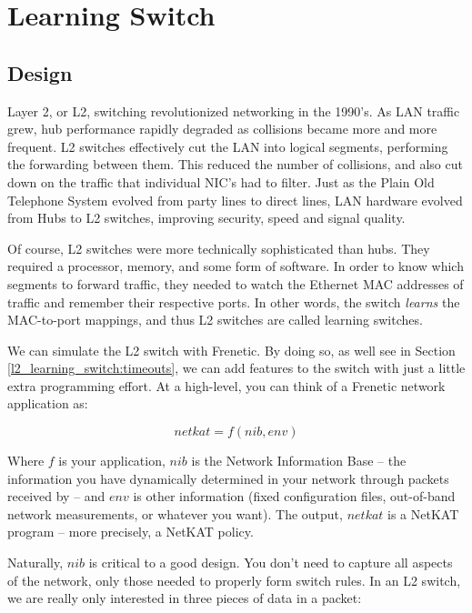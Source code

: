 
\chapter{Learning Switch}

\section{Design}
\label{l2_learning_switch:design}

Layer 2, or L2, switching revolutionized networking in the 1990's.
As LAN traffic grew, hub performance rapidly degraded as collisions became more and more frequent.
L2 switches effectively cut the LAN into logical segments, performing the forwarding between them.
This reduced the number of collisions, and also cut down on the traffic that individual
NIC's had to filter.  Just as the Plain Old 
Telephone System evolved from party lines to direct lines, LAN hardware evolved from Hubs to 
L2 switches, improving security, speed and signal quality.

Of course, L2 switches were more technically sophisticated than hubs.  They required a processor, memory, and 
some form of software.  In order to know which segments to forward traffic, they needed to 
watch the Ethernet MAC addresses of traffic and remember their respective ports.  In other words, the switch 
\emph{learns} the MAC-to-port mappings, and thus L2 switches are called learning switches.    

We can simulate the L2 switch with Frenetic.  By doing so, as well see in 
Section \ref{l2_learning_switch:timeouts},
we can add features to the switch with just a little extra programming effort.  At a high-level, 
you can think of a Frenetic network application as:

$$ netkat = f( nib, env ) $$

Where $f$ is your application, $nib$ is the Network Information Base -- the information you have dynamically determined in your network through
packets received by  -- and
$env$ is other information (fixed configuration files, out-of-band network measurements, or whatever you want).  
The output, $netkat$ is a NetKAT program -- more precisely, a NetKAT policy.

Naturally, $nib$ is critical to a good design.  You don't need to capture all aspects of the network,
only those needed to properly form switch rules.  In an L2 switch, we are really only interested in three 
pieces of data in a packet:

